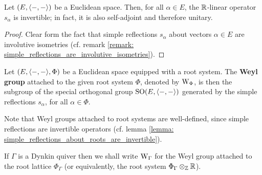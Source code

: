             \begin{lemma} \label{lemma: simple_reflections_about_roots_are_invertible}
                Let $(E, \langle-, -\rangle)$ be a Euclidean space. Then, for all $\alpha \in E$, the $\mathbb{R}$-linear operator $s_{\alpha}$ is invertible; in fact, it is also self-adjoint and therefore unitary.
            \end{lemma}
                \begin{proof}
                    Clear form the fact that simple reflections $s_{\alpha}$ about vectors $\alpha \in E$ are involutive isometries (cf. remark \ref{remark: simple_reflections_are_involutive_isometries}).
                \end{proof}
            \begin{definition} \label{def: weyl_groups}
                Let $(E, \langle-, -\rangle, \Phi)$ be a Euclidean space equipped with a root system. The \textbf{Weyl group} attached to the given root system $\Phi$, denoted by $\mathrm{W}_{\Phi}$, is then the subgroup of the special orthogonal group $\mathrm{SO}(E, \langle-, -\rangle)$ generated by the simple reflections $s_{\alpha}$, for all $\alpha \in \Phi$.
                
                Note that Weyl groups attached to root systems are well-defined, since simple reflections are invertible operators (cf. lemma \ref{lemma: simple_reflections_about_roots_are_invertible}).
            \end{definition}
            \begin{convention}
                If $\Gamma$ is a Dynkin quiver then we shall write $\mathrm{W}_{\Gamma}$ for the Weyl group attached to the root lattice $\Phi_{\Gamma}$ (or equivalently, the root system $\Phi_{\Gamma} \tensor_{\Z} \R$). 
            \end{convention}

